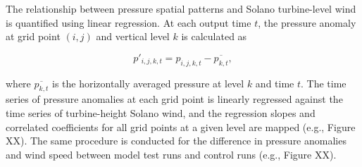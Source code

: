 The relationship between pressure spatial patterns and Solano turbine-level wind is quantified using linear regression.  At each output time $t$, the pressure anomaly at grid point $(i,j)$ and vertical level $k$ is calculated as

\begin{equation}
p'_{i,j,k,t} = p_{i,j,k,t} - \overline{p_{k,t}},
\end{equation}

where $\overline{p_{k,t}}$ is the horizontally averaged pressure at level $k$ and time $t$.  The time series of pressure anomalies at each grid point is linearly regressed against the time series of turbine-height Solano wind, and the regression slopes and correlated coefficients for all grid points at a given level are mapped (e.g., Figure XX).  The same procedure is conducted for the difference in pressure anomalies and wind speed between model test runs and control runs (e.g., Figure XX).

%
